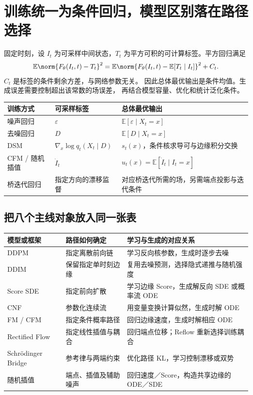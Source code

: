 \documentclass[language=chinese,margin=right,11pt]{lumenbook}
\begin{document}
\clearpage
\section*{训练统一为条件回归，模型区别落在路径选择}

固定时刻，设 \(I_t\) 为可采样中间状态，\(T_t\) 为平方可积的可计算标签。平方回归满足
\[
 \mathbb E\norm{F_\theta(I_t,t)-T_t}^2
 =\mathbb E\norm{F_\theta(I_t,t)-\mathbb E[T_t\mid I_t]}^2+C_t.
\]
\(C_t\) 是标签的条件剩余方差，与网络参数无关。
因此总体最优输出是条件均值。生成误差需要控制超出该常数的场误差，
再结合模型容量、优化和统计泛化条件。

\par\noindent
\begin{tabularx}{\textwidth}{@{}llX@{}}
\toprule
训练方式 & 可采样标签 & 总体最优输出 \\
\midrule
噪声回归 & \(\varepsilon\) & \(\mathbb E[\varepsilon\mid X_t=x]\) \\
去噪回归 & \(D\) & \(\mathbb E[D\mid X_t=x]\) \\
DSM & \(\nabla_x\log q_t(X_t\mid D)\) & \(s_t(x)\)，条件核求导可与边缘积分交换 \\
CFM / 随机插值 & \(\dot I_t\) & \(u_t(x)=\mathbb E[\dot I_t\mid I_t=x]\) \\
桥迭代回归 & 指定方向的漂移监督 & 对应桥迭代所需的场，另需端点投影与迭代条件 \\
\bottomrule
\end{tabularx}

\subsection*{把八个主线对象放入同一张表}
\par\noindent
\begin{tabularx}{\textwidth}{@{}llX@{}}
\toprule
模型或框架 & 路径如何确定 & 学习与生成的对应关系 \\
\midrule
DDPM & 指定离散前向链 & 学习反向核参数，生成时逐步去噪 \\
DDIM & 保留指定单时刻边缘 & 复用去噪预测，选择隐式递推与随机强度 \\
Score SDE & 指定前向扩散 & 学习边缘 Score，生成解反向 SDE 或概率流 ODE \\
CNF & 参数化连续流 & 用变量变换计算似然，生成时解 ODE \\
FM / CFM & 指定条件概率路径 & 回归边缘速度，生成时解相应 ODE \\
Rectified Flow & 指定线性插值与耦合 & 回归端点位移；Reflow 重新选择训练耦合 \\
Schrödinger Bridge & 参考律与两端约束 & 优化路径 KL，学习控制漂移或双势 \\
随机插值 & 端点、插值及辅助噪声 & 回归速度／Score，构造共享边缘的 ODE／SDE \\
\bottomrule
\end{tabularx}
\end{document}
